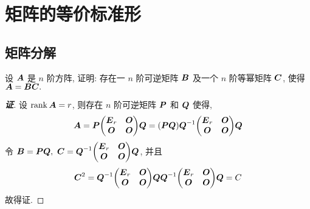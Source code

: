 \section{矩阵的等价标准形}

% 

\subsection{矩阵分解}

\begin{example}
    设 $\vb*{A}$ 是 $n$ 阶方阵, 证明: 存在一 $n$ 阶可逆矩阵 $\vb*{B}$ 及一个 $n$ 阶等幂矩阵 $\vb*{C}$, 使得 $\vb*{A}=\vb*{BC}.$
\end{example}
\begin{proof}[{\songti \textbf{证}}]
    设 $\rank\vb*{A}=r$, 则存在 $n$ 阶可逆矩阵 $\vb*{P}$ 和 $\vb*{Q}$ 使得, 
    $$\vb*{A}=\vb*{P}\mqty(\vb*{E}_r&\vb*{O}\\\vb*{O}&\vb*{O})\vb*{Q}=(\vb*{PQ})\vb*{Q}^{-1}\mqty(\vb*{E}_r&\vb*{O}\\\vb*{O}&\vb*{O})\vb*{Q}$$
    令 $\vb*{B}=\vb*{PQ},~\vb*{C}=\vb*{Q}^{-1}\mqty(\vb*{E}_r&\vb*{O}\\\vb*{O}&\vb*{O})\vb*{Q}$, 并且
    $$\vb*{C}^2=\vb*{Q}^{-1}\mqty(\vb*{E}_r&\vb*{O}\\\vb*{O}&\vb*{O})\vb*{Q}\vb*{Q}^{-1}\mqty(\vb*{E}_r&\vb*{O}\\\vb*{O}&\vb*{O})\vb*{Q}=C$$
    故得证.
\end{proof}

